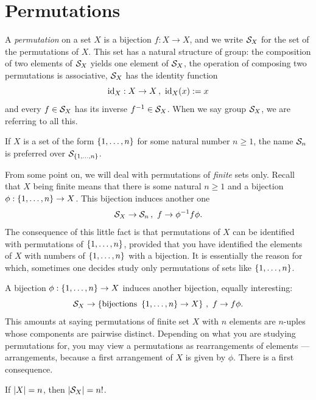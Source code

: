 
\section{Permutations}

A {\em permutation} on a set \(X\) is a bijection \(f : X \to X\), and  we write \(\mathcal S_X\) for the set of the permutations of \(X\). This set has a natural structure of group: the composition of two elements of \(\mathcal S_X\) yields one element of \(\mathcal S_X\), the operation of composing two permutations is associative, \(\mathcal S_X\) has the identity function
\[\text{id}_X : X \to X\,, \ \text{id}_X(x) := x\]
and every \(f \in \mathcal S_X\) has its inverse \(f^{-1} \in \mathcal S_X\). When we say group \(\mathcal S_X\), we are referring to all this. %

If \(X\) is a set of the form \(\left\{1, \dots{}, n\right\}\) for some natural number \(n \ge 1\), the name \(\mathcal S_n\) is preferred over \(\mathcal S_{\left\{1, \dots{}, n\right\}}\). 

From some point on, we will deal with permutations of {\em finite} sets only. Recall that \(X\) being finite means that there is some natural \(n \ge 1\) and a bijection \(\phi : \left\{1, \dots{}, n\right\} \to X\). This bijection induces another one
\[\mathcal S_X \to \mathcal S_n\,, \ f \to \phi^{-1} f \phi .\]
The consequence of this little fact is that permutations of \(X\) can be identified with permutations of \(\left\{1, \dots{}, n\right\}\), provided that you have identified the elements of \(X\) with numbers of \(\left\{1, \dots{}, n\right\}\) with a bijection. It is essentially the reason for which, sometimes one decides study only permutations of sets like \(\left\{1, \dots{}, n\right\}\).

A bijection \(\phi : \left\{1, \dots{}, n\right\} \to X\) induces another bijection, equally interesting:
%
\[\mathcal S_X \to \left\{\text{bijections } \left\{1, \dots{}, n\right\} \to X\right\}\,, \ f \to f \phi .\]
%
This amounts at saying permutations of finite set \(X\)  with \(n\) elements are \(n\)-uples whose components are pairwise distinct. Depending on what you are studying permutations for, you may view a permutations as rearrangements of elements --- arrangements, because a first arrangement of \(X\) is given by \(\phi\). There is a first consequence.

\begin{proposition}
If \(\left\lvert X\right\rvert = n\), then \(\left\lvert\mathcal S_X\right\rvert = n !\).
\end{proposition}


